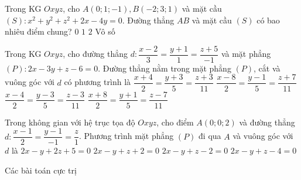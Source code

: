 	\begin{ex}%
	Trong KG $Oxyz$, cho $A(0;1;-1), B(-2;3;1)$ và mặt cầu $(S)\colon x^2+y^2+z^2+2x-4y=0$. Đường thẳng $AB$ và mặt cầu $(S)$ có bao nhiêu điểm chung?
	\choice
	{$0$}
	{$1$}
	{\True $2$}
	{Vô số}
	\end{ex}
	\begin{ex}%
	Trong KG $Oxyz$, cho đường thẳng $d\colon\dfrac{x-2}{3}=\dfrac{y+1}{1}=\dfrac{z+5}{-1}$ và mặt phẳng $(P)\colon2x-3y+z-6=0$. Đường thẳng nằm trong mặt phẳng $(P)$, cắt và vuông góc với $d$ có phương trình là
	\choice
	{$\dfrac{x+4}{2}=\dfrac{y+3}{5}=\dfrac{z+3}{11}$}
	{\True $\dfrac{x-8}{2}=\dfrac{y-1}{5}=\dfrac{z+7}{11}$}
	{$\dfrac{x-4}{2}=\dfrac{y-3}{5}=\dfrac{z-3}{11}$}
	{$\dfrac{x+8}{2}=\dfrac{y+1}{5}=\dfrac{z-7}{11}$}
	\end{ex}
	\begin{ex}%
	Trong không gian với hệ trục tọa độ $Oxyz$, cho điểm $A(0;0;2)$ và đường thẳng $d\colon \dfrac{x-1}{2}=\dfrac{y-1}{-1}=\dfrac{z}{1}$. Phương trình mặt phẳng $(P)$ đi qua $A$ và vuông góc với $d$ là
	\choice
	{$2x-y+2z+5=0$}
	{$2x-y+z+2=0$}
	{\True $2x-y+z-2=0$}
	{$2x-y+z-4=0$}
	\end{ex}
	\begin{dang}{Các bài toán cực trị}
	\end{dang}
\setcounter{subsubsection}{0}
\setcounter{vd}{0}
\setcounter{ex}{0}
